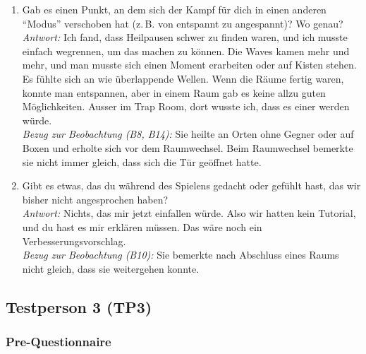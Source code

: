 \documentclass[../Main.tex]{subfiles}
\begin{document}
\begin{enumerate}[label=\textbf{I\arabic*}, leftmargin=1.5cm, itemsep=1em]
\item Gab es einen Punkt, an dem sich der Kampf für dich in einen anderen \enquote{Modus} verschoben hat (z.\,B. von entspannt zu angespannt)? Wo genau? \\
\textit{Antwort:} Ich fand, dass Heilpausen schwer zu finden waren, und ich musste einfach wegrennen, um das machen zu können. Die Waves kamen mehr und mehr, und man musste sich einen Moment erarbeiten oder auf Kisten stehen. Es fühlte sich an wie überlappende Wellen. Wenn die Räume fertig waren, konnte man entspannen, aber in einem Raum gab es keine allzu guten Möglichkeiten. Ausser im Trap Room, dort wusste ich, dass es einer werden würde. \\
\textit{Bezug zur Beobachtung (B8, B14):} Sie heilte an Orten ohne Gegner oder auf Boxen und erholte sich vor dem Raumwechsel. Beim Raumwechsel bemerkte sie nicht immer gleich, dass sich die Tür geöffnet hatte.

\item Gibt es etwas, das du während des Spielens gedacht oder gefühlt hast, das wir bisher nicht angesprochen haben? \\
\textit{Antwort:} Nichts, das mir jetzt einfallen würde. Also wir hatten kein Tutorial, und du hast es mir erklären müssen. Das wäre noch ein Verbesserungsvorschlag. \\
\textit{Bezug zur Beobachtung (B10):} Sie bemerkte nach Abschluss eines Raums nicht gleich, dass sie weitergehen konnte.
\end{enumerate}

\subsection{Testperson 3 (TP3)}

\subsubsection{Pre-Questionnaire}
\end{document}
